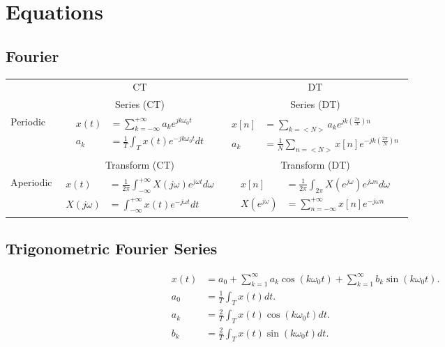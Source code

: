 \section*{Equations}
\subsection*{Fourier}
\centering
{\renewcommand{\arraystretch}{4}%
    \begin{tabular}{lcc}

    & CT & DT\\
        \cline{2-3}
    & Series (CT) & Series (DT)\\
    \cline{2-3}
    Periodic &
    $\begin{aligned}
        x(t) &= \sum_{k=-\infty}^{+\infty}a_k e^{jk\omega_0 t}\\
        a_k &= \frac{1}{T} \int_{T}x(t)e^{-jk\omega_0 t}dt
    \end{aligned}$\par

    &
    $\begin{aligned}
        x[n] &= \sum_{k=<N>}a_k e^{jk\left(\frac{2\pi}{N}\right) n}\\
        a_k &= \frac{1}{N} \sum_{n=<N>}x[n]e^{-jk\left(\frac{2\pi}{N}\right)n}
    \end{aligned}$\par
    \\[4ex]
        \cline{2-3}
     & Transform (CT) & Transform (DT)\\
    \cline{2-3}
    Aperiodic &
    $\begin{aligned}
        x(t) &= \frac{1}{2\pi}\int_{-\infty}^{+\infty} X(j\omega)e^{j\omega t}d\omega\\
        X(j\omega) &=  \int_{-\infty}^{+\infty}x(t)e^{-j\omega t}dt
    \end{aligned}$\par

    &


    $\begin{aligned}
        x[n] &= \frac{1}{2\pi}\int_{2\pi} X(e^{j\omega})e^{j\omega n}d\omega\\
        X(e^{j\omega}) &= \sum_{n=-\infty}^{+\infty}x[n]e^{-j\omega n}
    \end{aligned}$\par
    \\[4ex]
        \cline{2-3}
    \end{tabular}
    }
    
        \subsection*{Trigonometric Fourier Series}

    \begin{align*}
        x(t) &= a_0 + \sum_{k=1}^{\infty}a_k \cos(k\omega_0 t) + \sum_{k=1}^{\infty}b_k \sin(k\omega_0 t).\\
        a_0 &= \frac{1}{T}\int_T x(t)dt.\\
        a_k &= \frac{2}{T}\int_T x(t)\cos(k\omega_0 t)dt.\\
        b_k &= \frac{2}{T}\int_T x(t)\sin(k\omega_0 t)dt.
    \end{align*}
